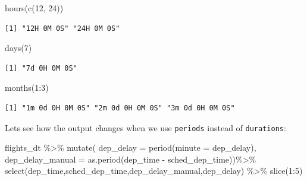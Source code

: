 \documentclass[
  letterpaper,
  DIV=11,
  numbers=noendperiod]{scrartcl}
\newenvironment{Shaded}{\begin{snugshade}}{\end{snugshade}}
\newcommand{\AttributeTok}[1]{\textcolor[rgb]{0.40,0.45,0.13}{#1}}
\newcommand{\DecValTok}[1]{\textcolor[rgb]{0.68,0.00,0.00}{#1}}
\newcommand{\FunctionTok}[1]{\textcolor[rgb]{0.28,0.35,0.67}{#1}}
\newcommand{\NormalTok}[1]{\textcolor[rgb]{0.00,0.23,0.31}{#1}}
\newcommand{\SpecialCharTok}[1]{\textcolor[rgb]{0.37,0.37,0.37}{#1}}
\begin{document}
\begin{Shaded}
\begin{Highlighting}[]
\FunctionTok{hours}\NormalTok{(}\FunctionTok{c}\NormalTok{(}\DecValTok{12}\NormalTok{, }\DecValTok{24}\NormalTok{))}
\end{Highlighting}
\end{Shaded}

\begin{verbatim}
[1] "12H 0M 0S" "24H 0M 0S"
\end{verbatim}

\begin{Shaded}
\begin{Highlighting}[]
\FunctionTok{days}\NormalTok{(}\DecValTok{7}\NormalTok{)}
\end{Highlighting}
\end{Shaded}

\begin{verbatim}
[1] "7d 0H 0M 0S"
\end{verbatim}

\begin{Shaded}
\begin{Highlighting}[]
\FunctionTok{months}\NormalTok{(}\DecValTok{1}\SpecialCharTok{:}\DecValTok{3}\NormalTok{)}
\end{Highlighting}
\end{Shaded}

\begin{verbatim}
[1] "1m 0d 0H 0M 0S" "2m 0d 0H 0M 0S" "3m 0d 0H 0M 0S"
\end{verbatim}

Lets see how the output changes when we use \texttt{periods} instead of
\texttt{durations}:

\begin{Shaded}
\begin{Highlighting}[]
\NormalTok{flights\_dt }\SpecialCharTok{\%\textgreater{}\%}
  \FunctionTok{mutate}\NormalTok{(}
      \AttributeTok{dep\_delay =} \FunctionTok{period}\NormalTok{(}\AttributeTok{minute  =}\NormalTok{ dep\_delay),}
      \AttributeTok{dep\_delay\_manual =}  \FunctionTok{as.period}\NormalTok{(dep\_time }\SpecialCharTok{{-}}\NormalTok{ sched\_dep\_time))}\SpecialCharTok{\%\textgreater{}\%}
  \FunctionTok{select}\NormalTok{(dep\_time,sched\_dep\_time,dep\_delay\_manual,dep\_delay)  }\SpecialCharTok{\%\textgreater{}\%}
  \FunctionTok{slice}\NormalTok{(}\DecValTok{1}\SpecialCharTok{:}\DecValTok{5}\NormalTok{)}
\end{Highlighting}
\end{Shaded}
\end{document}
